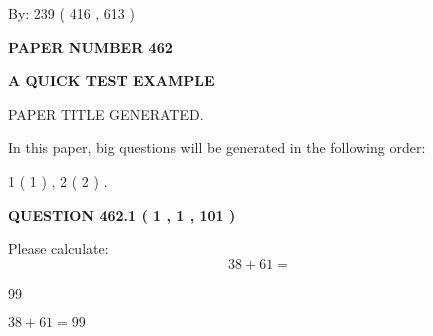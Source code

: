 \documentclass[12pt]{article}
\begin{document}
   
\hspace{1.0in} By: 
 239 ( 416 ,  613 )
   
   
   
   
\newpage 
\setcounter{page}{ 
   462001 } 
   
   
   
   
 {\textbf{ \Large{ PAPER NUMBER  462  }}}
   
   
\vspace{0.2in}
   
   
   
   
   
   
   
   
 \vspace{0.2in}
{\LARGE {\textbf{ A QUICK TEST EXAMPLE}}}
   
   
 PAPER TITLE GENERATED.
   
   
   
\vspace{0.2in}
   
In this paper, big questions will be generated in the following order: 
   
   
   1 ( 1 )
 ,
   2 ( 2 )
 .
  
\vspace{0.2in}
  
{\textbf{\Large{QUESTION
462.1 
 ( 1 , 1 , 101 )
}}}
  
  
 
Please calculate:
\begin{equation}
38 +  %
61 = \nonumber
\end{equation}
 
 
 
\noindent{}
 
 

99
 
 
\noindent{}
 
 

 
 
 
\noindent{}
 
 

$ %
38 +  %
61=   %
99$
 
 
\noindent{}
 
\end{document}
